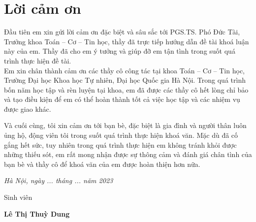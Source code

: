 \chapter*{Lời cảm ơn}
\thispagestyle{empty}
\fontsize{14}{16}\selectfont
\begin{center}
\end{center}
\hspace*{1.5cm}Đầu tiên em xin gửi lời cảm ơn đặc biệt và sâu sắc tới PGS.TS. Phó Đức Tài, Trưởng
khoa Toán – Cơ – Tin học, thầy đã trực tiếp hướng dẫn đề tài khoá luận này của em.
Thầy đã cho em ý tưởng và giúp đỡ em tận tình trong suốt quá trình thực hiện đề tài. \\
\hspace*{1.5cm} Em xin chân thành cảm ơn các thầy cô công tác tại khoa Toán – Cơ – Tin học,
Trường Đại học Khoa học Tự nhiên, Đại học Quốc gia Hà Nội. Trong quá trình bốn
năm học tập và rèn luyện tại khoa, em đã được các thầy cô hết lòng chỉ bảo và tạo
điều kiện để em có thể hoàn thành tốt cả việc học tập và các nhiệm vụ được giao
khác.

Và cuối cùng, tôi xin cảm ơn tới bạn bè, đặc biệt là gia đình và người thân luôn 
ủng hộ, động viên tôi trong suốt quá trình thực hiện khoá văn. Mặc dù đã cố gắng hết sức, tuy 
nhiên trong quá trình thực hiện em không tránh khỏi được những thiếu sót, em rất mong nhận được 
sự thông cảm và đánh giá chân tình của bạn bè và thầy cô để khoá văn của em được hoàn thiện hơn nữa.
\begin{flushright}
{\it Hà Nội, ngày ... tháng ... năm 2023}

Sinh viên\hskip 2cm\quad

\vskip 1cm
{\bf Lê Thị Thuỳ Dung} \hskip 1cm \quad\ 
 \end{flushright}


